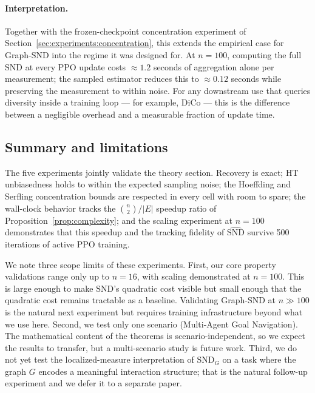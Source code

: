 \documentclass[11pt]{article}
\theoremstyle{plain}
\theoremstyle{definition}
\theoremstyle{remark}
\newcommand{\SND}{\ensuremath{\mathrm{SND}}}
\newcommand{\SNDG}{\mathrm{SND}_{G}}
\begin{document}
\paragraph{Interpretation.} Together with the frozen-checkpoint
concentration experiment of
Section~\ref{sec:experiments:concentration}, this extends the
empirical case for Graph-SND into the regime it was designed for. At
$n = 100$, computing the full $\SND$ at every PPO update costs
$\approx\!1.2$ seconds of aggregation alone per measurement; the
sampled estimator reduces this to $\approx\!0.12$ seconds while
preserving the measurement to within noise. For any downstream use
that queries diversity inside a training loop --- for example, DiCo
\citep{bettini2024dico} --- this is the difference between a
negligible overhead and a measurable fraction of update time.

\subsection{Summary and limitations}
\label{sec:experiments:summary}

The five experiments jointly validate the theory section. Recovery is
exact; HT unbiasedness holds to within the expected sampling noise;
the Hoeffding and Serfling concentration bounds are respected in
every cell with room to spare; the wall-clock behavior tracks the
$\binom{n}{2}/|E|$ speedup ratio of Proposition~\ref{prop:complexity};
and the scaling experiment at $n=100$ demonstrates that this speedup
and the tracking fidelity of $\widehat{\SND}$ survive 500 iterations
of active PPO training.

We note three scope limits of these experiments. First, our core property validations range only up to $n=16$, with scaling demonstrated at $n=100$. This is large enough to make $\SND$'s quadratic cost visible but small enough that the quadratic cost remains tractable as a baseline. Validating Graph-SND at $n \gg 100$ is the natural next experiment but requires training infrastructure beyond what we use here. Second, we test only one scenario (Multi-Agent Goal Navigation).
The mathematical content of the theorems is scenario-independent, so
we expect the results to transfer, but a multi-scenario study is
future work. Third, we do not yet test the localized-measure
interpretation of $\SNDG$ on a task where the graph $G$ encodes a
meaningful interaction structure; that is the natural follow-up
experiment and we defer it to a separate paper.

\end{document}
